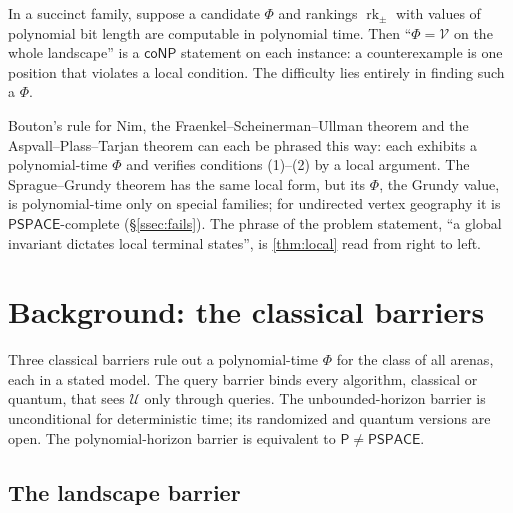 \documentclass[final]{siamart0516}
\numberwithin{theorem}{section}
\numberwithin{equation}{section}
\theoremstyle{siamnonum}
\theoremstyle{plain}
\newcommand{\val}{\mathcal{V}}            %
\newcommand{\pay}{\mathcal{U}}            %
\newcommand{\rk}{\operatorname{rk}}
\newcommand{\cls}[1]{\mathsf{#1}}
\newcommand{\PSPACE}{\cls{PSPACE}}
\newcommand{\coNP}{\cls{coNP}}
\newcommand{\Pclass}{\cls{P}}
\begin{document}
\begin{corollary}\label{cor:certify}
In a succinct family, suppose a candidate $\Phi$ and rankings $\rk_{\pm}$ with values of polynomial bit length are computable in polynomial time. Then ``$\Phi=\val$ on the whole landscape'' is a $\coNP$ statement on each instance: a counterexample is one position that violates a local condition. The difficulty lies entirely in finding such a $\Phi$.
\end{corollary}

\begin{remark}\label{rem:template}
Bouton's rule for Nim, the Fraenkel--Scheinerman--Ullman theorem and the Aspvall--Plass--Tarjan theorem can each be phrased this way: each exhibits a polynomial-time $\Phi$ and verifies conditions (1)--(2) by a local argument. The Sprague--Grundy theorem has the same local form, but its $\Phi$, the Grundy value, is polynomial-time only on special families; for undirected vertex geography it is $\PSPACE$-complete (\S\ref{ssec:fails}). The phrase of the problem statement, ``a global invariant dictates local terminal states'', is \cref{thm:local} read from right to left.
\end{remark}

\section{Background: the classical barriers}\label{sec:barriers}

Three classical barriers rule out a polynomial-time $\Phi$ for the class of all arenas, each in a stated model. The query barrier binds every algorithm, classical or quantum, that sees $\pay$ only through queries. The unbounded-horizon barrier is unconditional for deterministic time; its randomized and quantum versions are open. The polynomial-horizon barrier is equivalent to $\Pclass\neq\PSPACE$.

\subsection{The landscape barrier}
\end{document}
